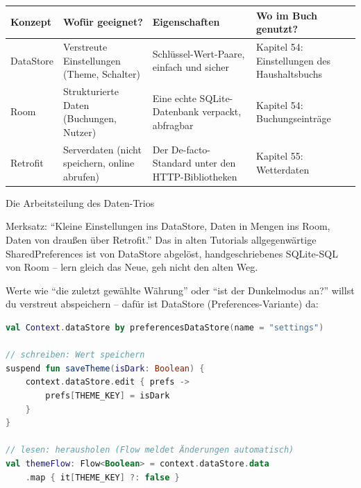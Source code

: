 


\begin{center}
\begin{tabularx}{\linewidth}{|X|X|X|X|}
\hline
\textbf{Konzept} & \textbf{Wofür geeignet?} & \textbf{Eigenschaften} & \textbf{Wo im Buch genutzt?} \tabularnewline
\hline
DataStore & Verstreute Einstellungen (Theme, Schalter) & Schlüssel-Wert-Paare, einfach und sicher & Kapitel 54: Einstellungen des Haushaltsbuchs \tabularnewline
Room & Strukturierte Daten (Buchungen, Nutzer) & Eine echte SQLite-Datenbank verpackt, abfragbar & Kapitel 54: Buchungseinträge \tabularnewline
Retrofit & Serverdaten (nicht speichern, online abrufen) & Der De-facto-Standard unter den HTTP-Bibliotheken & Kapitel 55: Wetterdaten \tabularnewline
\hline
\end{tabularx}
\end{center}

\begin{center}\small\color{gray}Die Arbeitsteilung des Daten-Trios\end{center}

Merksatz: “Kleine Einstellungen ins DataStore, Daten in Mengen ins Room, Daten von draußen über Retrofit.” Das in alten Tutorials allgegenwärtige SharedPreferences ist von DataStore abgelöst, handgeschriebenes SQLite-SQL von Room – lern gleich das Neue, geh nicht den alten Weg.


Werte wie “die zuletzt gewählte Währung” oder “ist der Dunkelmodus an?” willst du verstreut abspeichern – dafür ist DataStore (Preferences-Variante) da:

\begin{lstlisting}[language=Kotlin]
val Context.dataStore by preferencesDataStore(name = "settings")

// schreiben: Wert speichern
suspend fun saveTheme(isDark: Boolean) {
    context.dataStore.edit { prefs ->
        prefs[THEME_KEY] = isDark
    }
}

// lesen: herausholen (Flow meldet Änderungen automatisch)
val themeFlow: Flow<Boolean> = context.dataStore.data
    .map { it[THEME_KEY] ?: false }
\end{lstlisting}

